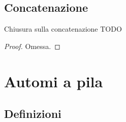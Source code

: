 \documentclass[a4paper, 12pt]{report}
\begin{document}
    \subsection{Concatenazione}

    \begin{framedprop}{Chiusura sulla concatenazione}
        TODO
    \end{framedprop}

    \begin{proof}
        Omessa.
    \end{proof}

    \section{Automi a pila}

    \subsection{Definizioni}
\end{document}
